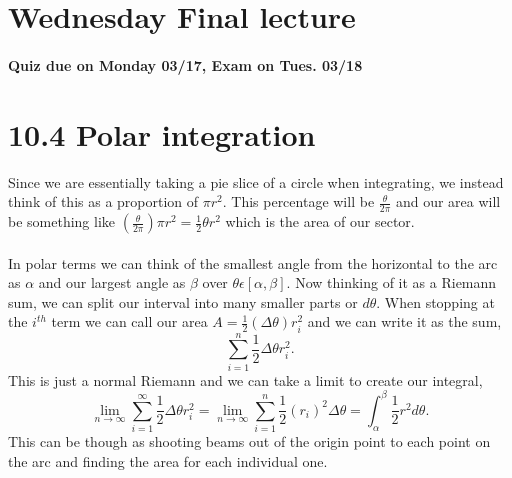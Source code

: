 \section{Wednesday Final lecture}%
\label{sec:Wednesday Final lecture}
\paragraph{Quiz due on Monday 03/17, Exam on Tues. 03/18}
\section{10.4 Polar integration}%
\label{sec:10.4 Polar integration}
Since we are essentially taking a pie slice of a circle when integrating, we instead think of this as a proportion of $ \pi r^2 $. This percentage will be $ \frac{ \theta }{ 2\pi } $ and our area will be something like $ \left( \frac{ \theta }{ 2\pi  } \right) \pi r^2 = \frac{ 1 }{ 2 } \theta r^2 $ which is the area of our sector. \\ \\

In polar terms we can think of the smallest angle from the horizontal to the arc as $ \alpha $ and our largest angle as $ \beta $ over $ \theta \epsilon \left[ \alpha, \beta \right]  $. Now thinking of it as a Riemann sum, we can split our interval into many smaller parts or $ d\theta $. 
When stopping at the $ i^{ th } $ term we can call our area $ A=\frac{ 1 }{ 2 } \left( \Delta \theta \right) r_i^2 $ and we can write it as the sum,
\[
\sum_{ i=1 } ^{ n } \frac{ 1 }{ 2 } \Delta \theta r_i^2
.\] 
This is just a normal Riemann and we can take a limit to create our integral,
\[
\lim_{ n \to \infty} \sum_{ i=1 } ^{ \infty } \frac{ 1 }{ 2 } \Delta \theta r_i^2 = \lim_{ n \to \infty} \sum_{ i=1 } ^{ n } \frac{ 1 }{ 2 } \left( r_i \right) ^2 \Delta \theta = \int_{ \alpha }^{ \beta } \frac{ 1 }{ 2 } r^2d\theta
.\] 
This can be though as shooting beams out of the origin point to each point on the arc and finding the area for each individual one. 

